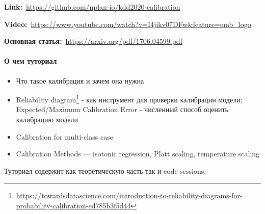 \textbf{Link:}~\url{https://github.com/nplan-io/kdd2020-calibration}

\textbf{Video:}~\url{https://www.youtube.com/watch?v=I4jikv07DFw&feature=emb_logo}

\textbf{Основная статья:}~\url{https://arxiv.org/pdf/1706.04599.pdf}

\paragraph{О чем туториал}

\begin{itemize}
    \item Что такое калибрация и зачем она нужна
    \item Reliability diagram\footnote{\url{https://towardsdatascience.com/introduction-to-reliability-diagrams-for-probability-calibration-ed785b3f5d44}} - как инструмент для проверки калибрации модели; Expected/Maximum Calibration Error - численный способ оценить калибрацию модели
    \item Calibration for multi-class case
    \item Calibration Methods --- isotonic regression, Platt scaling, temperature scaling
\end{itemize}

Туториал содержит как теоретическую часть так и code sessions.